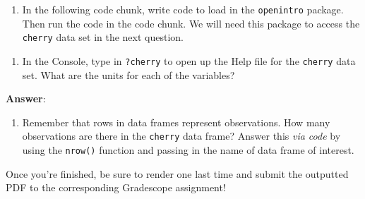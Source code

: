 \documentclass[
  letterpaper,
  DIV=11,
  numbers=noendperiod]{scrartcl}
\providecommand{\tightlist}{%
  \setlength{\itemsep}{0pt}\setlength{\parskip}{0pt}}
\begin{document}
\begin{enumerate}
\def\labelenumi{\arabic{enumi}.}
\setcounter{enumi}{4}
\tightlist
\item
  In the following code chunk, write code to load in the
  \texttt{openintro} package. Then run the code in the code chunk. We
  will need this package to access the \texttt{cherry} data set in the
  next question.
\end{enumerate}

\begin{enumerate}
\def\labelenumi{\arabic{enumi}.}
\setcounter{enumi}{5}
\tightlist
\item
  In the Console, type in \texttt{?cherry} to open up the Help file for
  the \texttt{cherry} data set. What are the units for each of the
  variables?
\end{enumerate}

\textbf{Answer}:

\begin{enumerate}
\def\labelenumi{\arabic{enumi}.}
\setcounter{enumi}{6}
\tightlist
\item
  Remember that rows in data frames represent observations. How many
  observations are there in the \texttt{cherry} data frame? Answer this
  \emph{via code} by using the \texttt{nrow()} function and passing in
  the name of data frame of interest.
\end{enumerate}

Once you're finished, be sure to render one last time and submit the
outputted PDF to the corresponding Gradescope assignment!
\end{document}
